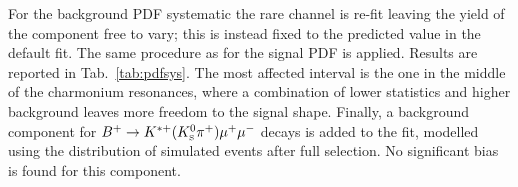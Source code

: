 \begin{center}
\begin{table}[h]
\centering
\caption{$\chi^2$, NDF, p-values and number of signal events obtained fitting \Lb\to\jpsi\Lz data using different models.}
\label{PDFsys}
\end{table}
\end{center}

For the background PDF systematic the rare channel is re-fit leaving the yield of the \KS component free to vary;
this is instead fixed to the predicted value in the default fit. The same procedure as for the signal PDF is applied.
Results are reported in Tab.~\ref{tab:pdfsys}. The most affected \qsq interval is the one in the middle of the charmonium
resonances, where a combination of lower statistics and higher background leaves more freedom to the signal shape.
Finally, a background component for $B^{+} \ra K^{*+}(\KS\pi^+)\mumu$ decays is added to the fit, modelled using
the distribution of simulated events after full selection. No significant bias is found for this component.

